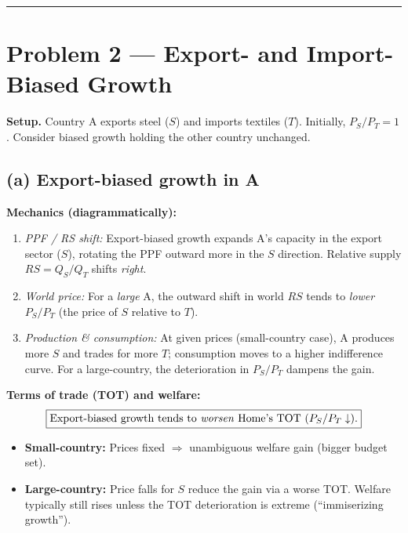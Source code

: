 \documentclass[12pt]{article}
\begin{document}
\hrule
\vspace{0.7em}

\section*{Problem 2 — Export- and Import-Biased Growth}

\textbf{Setup.} Country A exports steel ($S$) and imports textiles ($T$). Initially, $P_S/P_T = 1$. Consider biased growth holding the other country unchanged.

\subsection*{(a) Export-biased growth in A}
\textbf{Mechanics (diagrammatically):}
\begin{enumerate}[label=\roman*)]
\item \textit{PPF / RS shift:} Export-biased growth expands A's capacity in the export sector ($S$), rotating the PPF outward more in the $S$ direction. Relative supply $RS = Q_S/Q_T$ shifts \emph{right}.
\item \textit{World price:} For a \emph{large} A, the outward shift in world $RS$ tends to \emph{lower} $P_S/P_T$ (the price of $S$ relative to $T$).
\item \textit{Production \& consumption:} At given prices (small-country case), A produces more $S$ and trades for more $T$; consumption moves to a higher indifference curve. For a large-country, the deterioration in $P_S/P_T$ dampens the gain.
\end{enumerate}

\textbf{Terms of trade (TOT) and welfare:}
\[
\boxed{\text{Export-biased growth tends to \emph{worsen} Home's TOT }(P_S/P_T \downarrow).}
\]
\begin{itemize}
\item \textbf{Small-country:} Prices fixed $\Rightarrow$ unambiguous welfare gain (bigger budget set).
\item \textbf{Large-country:} Price falls for $S$ reduce the gain via a worse TOT. Welfare typically still rises unless the TOT deterioration is extreme (``immiserizing growth'').
\end{itemize}
\end{document}
